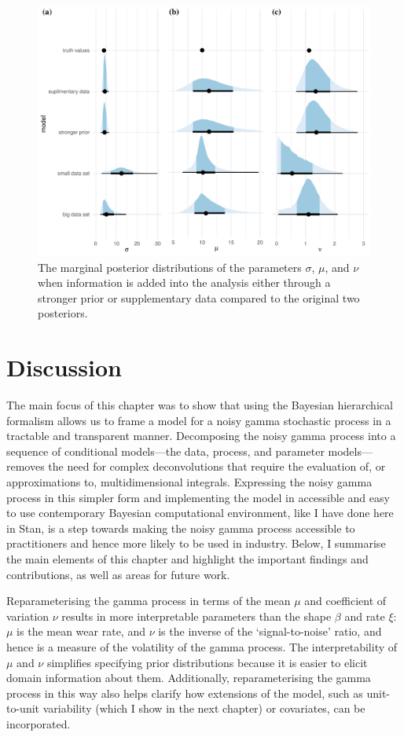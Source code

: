 \begin{figure}
  \centering
  \includegraphics[width=0.8\columnwidth]{./figures/ch-4/marginal-post-extra-info.pdf}
  \caption{The marginal posterior distributions of the parameters $\sigma$, $\mu$, and $\nu$ when information is added into the analysis either through a stronger prior or supplementary data compared to the original two posteriors.}
  \label{fig:marginal-post-extra-info}
\end{figure}

\section{Discussion} \label{sec:NGP-discussion}

The main focus of this chapter was to show that using the Bayesian hierarchical formalism allows us to frame a model for a noisy gamma stochastic process in a tractable and transparent manner. Decomposing the noisy gamma process into a sequence of conditional models---the data, process, and parameter models---removes the need for complex deconvolutions that require the evaluation of, or approximations to, multidimensional integrals. Expressing the noisy gamma process in this simpler form and implementing the model in accessible and easy to use contemporary Bayesian computational environment, like I have done here in Stan, is a step towards making the noisy gamma process accessible to practitioners and hence more likely to be used in industry. Below, I summarise the main elements of this chapter and highlight the important findings and contributions, as well as areas for future work.

Reparameterising the gamma process in terms of the mean $\mu$ and coefficient of variation $\nu$ results in more interpretable parameters than the shape $\beta$ and rate $\xi$: $\mu$ is the mean wear rate, and $\nu$ is the inverse of the `signal-to-noise' ratio, and hence is a measure of the volatility of the gamma process. The interpretability of $\mu$ and $\nu$ simplifies specifying prior distributions because it is easier to elicit domain information about them. Additionally, reparameterising the gamma process in this way also helps clarify how extensions of the model, such as unit-to-unit variability (which I show in the next chapter) or covariates, can be incorporated.

